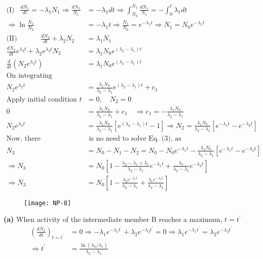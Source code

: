 \begin{align*}
\text{(I) }\ \ \frac{d N_1}{d t}=-\lambda_1 N_1 \Rightarrow \frac{d N_1}{N_1}&=-\lambda_1 d t \Rightarrow \int_{N_0}^{N_1} \frac{d N_1}{N_1}=-\int_0^t \lambda_1 d t\\
\Rightarrow \ln \frac{N_1}{N_0}&=-\lambda_1 t \Rightarrow \frac{N_1}{N_0}=e^{-\lambda_1 t} \Rightarrow N_1=N_0 e^{-\lambda_1 t}
\\
\text{(II) }\qquad \quad \frac{d N_2}{d t}+\lambda_2 N_2&=\lambda_1 N_1\\
\frac{d N_2}{d t} e^{\lambda_2 t}+\lambda_2 e^{\lambda_2 t} N_2&=\lambda_1 N_0 e^{\left(\lambda_2-\lambda_1\right) t} \\
\frac{d}{d t}\left(N_2 e^{\lambda_2 t}\right)&=\lambda_1 N_0 e^{\left(\lambda_2-\lambda_1\right) t}\\
\text{On integrating}&\\
N_2 e^{\lambda_2 t}&=\frac{\lambda_1 N_0}{\lambda_2-\lambda_1} e^{\left(\lambda_2-\lambda_1\right) t}+c_1\\
\text{Apply initial condition }t&=0, \quad N_2=0\\
0&=\frac{\lambda_1 N_0}{\lambda_2-\lambda_1}+c_1 \quad \Rightarrow c_1=-\frac{\lambda_1 N_0}{\lambda_2-\lambda_1}\\
N_2 e^{\lambda_2 t}&=\frac{\lambda_1 N_0}{\lambda_2-\lambda_1}\left[e^{\left(\lambda_2-\lambda_1\right) t}-1\right] \Rightarrow N_2=\frac{\lambda_1 N_0}{\lambda_2-\lambda_1}\left[e^{-\lambda_1 t}-e^{-\lambda_2 t}\right]\\
\text{Now, there}&\text{ is no need to solve Eq. (3), as}\\
N_3&=N_0-N_1-N_2=N_0-N_0 e^{-\lambda_1 t}-\frac{\lambda_1 N_0}{\lambda_2-\lambda_1}\left[e^{-\lambda_1 t}-e^{-\lambda_2 t}\right] \\
\Rightarrow N_3&=N_0\left[1-\frac{\lambda_2-\lambda_1+\lambda_1}{\lambda_2-\lambda_1} e^{-\lambda_1 t}+\frac{\lambda_1}{\lambda_2-\lambda_1} e^{-\lambda_2 t}\right] \\
\Rightarrow N_3&=N_0\left[1-\frac{\lambda_2 e^{-\lambda_1 t}}{\lambda_2-\lambda_1}+\frac{\lambda_1 e^{-\lambda_2 t}}{\lambda_2-\lambda_1}\right]
\end{align*}
\begin{figure}[H]
	\centering
	\texttt{[image: NP-8]}
	\caption{}
	\label{}
\end{figure}
\textbf{(a) }When activity of the intermediate member B reaches a maximum, $t=t^{\prime}$
\begin{align*}
\left(\frac{d N_2}{d t}\right)_{t=t^{\prime}}&=0 \Rightarrow-\lambda_1 e^{-\lambda_1 t^{\prime}}+\lambda_2 e^{-\lambda_2 t^{\prime}}=0 \Rightarrow \lambda_1 e^{-\lambda_1 t^{\prime}}=\lambda_2 e^{-\lambda_2 t^{\prime}} \\
\Rightarrow t^{\prime}&=\frac{\ln \left(\lambda_2 / \lambda_1\right)}{\lambda_2-\lambda_1}
\end{align*}
